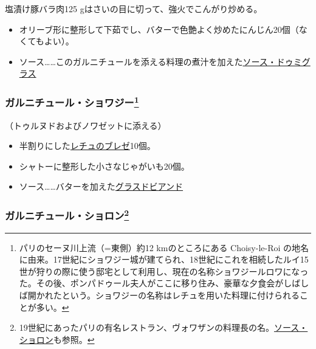 \begin{recette}
塩漬け豚バラ肉125 gはさいの目に切って、強火でこんがり炒める。

\begin{itemize}
\item
  オリーブ形に整形して下茹でし、バターで色艶よく炒めたにんじん20個（なくてもよい）。
\item
  ソース\ldots{}\ldots{}このガルニチュールを添える料理の煮汁を加えた\protect\hyperlink{sauce-demi-glace}{ソース・ドゥミグラス}
\end{itemize}

\hypertarget{garniture-choisy}{%
\subsubsection[ガルニチュール・ショワジー]{\texorpdfstring{ガルニチュール・ショワジー\footnote{パリのセーヌ川上流（=東側）約12
  kmのところにある Choisy-le-Roi
  の地名に由来。17世紀にショワジー城が建てられ、18世紀にこれを相続したルイ15世が狩りの際に使う邸宅として利用し、現在の名称ショワジールロワになった。その後、ポンパドゥール夫人がここに移り住み、豪華な夕食会がしばしば開かれたという。ショワジーの名称はレチュを用いた料理に付けられることが多い。}}{ガルニチュール・ショワジー}}\label{garniture-choisy}}



（トゥルヌドおよびノワゼットに添える）

\begin{itemize}
\item
  半割りにした\protect\hyperlink{laitue-braise}{レチュのブレゼ}10個。
\item
  シャトーに整形した小さなじゃがいも20個。
\item
  ソース\ldots{}\ldots{}バターを加えた\protect\hyperlink{glace-de-viande}{グラスドビアンド}
\end{itemize}

\hypertarget{garniture-choron}{%
\subsubsection[ガルニチュール・ショロン]{\texorpdfstring{ガルニチュール・ショロン\footnote{19世紀にあったパリの有名レストラン、ヴォワザンの料理長の名。\protect\hyperlink{sauce-bearnaise-tomatee}{ソース・ショロン}も参照。}}{ガルニチュール・ショロン}}\label{garniture-choron}}


\end{recette}
